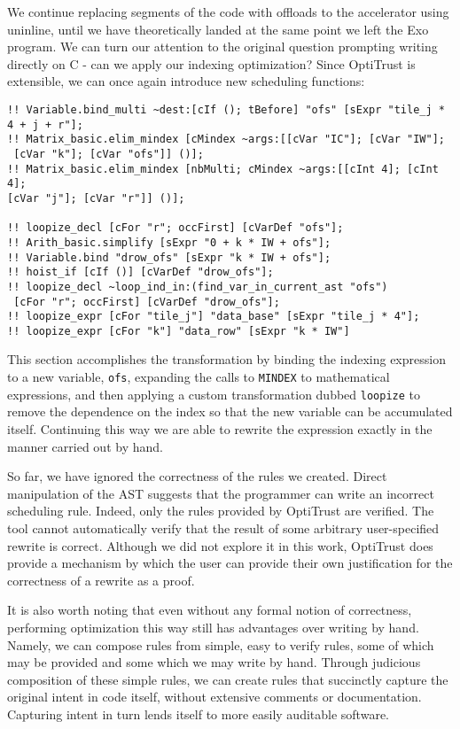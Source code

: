 \documentclass[acmsmall, nonacm=true]{acmart}
\begin{document}
We continue replacing segments of the code with offloads to the accelerator using uninline, until we have theoretically landed at the same point we left the Exo program. We can turn our attention to the original question prompting writing directly on C - can we apply our indexing optimization? Since OptiTrust is extensible, we can once again introduce new scheduling functions:

\begin{verbatim}
!! Variable.bind_multi ~dest:[cIf (); tBefore] "ofs" [sExpr "tile_j * 4 + j + r"];
!! Matrix_basic.elim_mindex [cMindex ~args:[[cVar "IC"]; [cVar "IW"];
 [cVar "k"]; [cVar "ofs"]] ()];
!! Matrix_basic.elim_mindex [nbMulti; cMindex ~args:[[cInt 4]; [cInt 4];
[cVar "j"]; [cVar "r"]] ()];

!! loopize_decl [cFor "r"; occFirst] [cVarDef "ofs"];
!! Arith_basic.simplify [sExpr "0 + k * IW + ofs"];
!! Variable.bind "drow_ofs" [sExpr "k * IW + ofs"];
!! hoist_if [cIf ()] [cVarDef "drow_ofs"];
!! loopize_decl ~loop_ind_in:(find_var_in_current_ast "ofs")
 [cFor "r"; occFirst] [cVarDef "drow_ofs"];
!! loopize_expr [cFor "tile_j"] "data_base" [sExpr "tile_j * 4"];
!! loopize_expr [cFor "k"] "data_row" [sExpr "k * IW"]
\end{verbatim}

This section accomplishes the transformation by binding the indexing expression to a new variable, \verb|ofs|, expanding the calls to \verb|MINDEX| to mathematical expressions, and then applying a custom transformation dubbed \verb|loopize| to remove the dependence on the index so that the new variable can be accumulated itself. Continuing this way we are able to rewrite the expression exactly in the manner carried out by hand.

So far, we have ignored the correctness of the rules we created. Direct manipulation of the AST suggests that the programmer can write an incorrect scheduling rule. Indeed, only the rules provided by OptiTrust are verified. The tool cannot automatically verify that the result of some arbitrary user-specified rewrite is correct. Although we did not explore it in this work, OptiTrust does provide a mechanism by which the user can provide their own justification for the correctness of a rewrite as a proof.

It is also worth noting that even without any formal notion of correctness, performing optimization this way still has advantages over writing by hand. Namely, we can compose rules from simple, easy to verify rules, some of which may be provided and some which we may write by hand. Through judicious composition of these simple rules, we can create rules that succinctly capture the original intent in code itself, without extensive comments or documentation. Capturing intent in turn lends itself to more easily auditable software.
\end{document}
